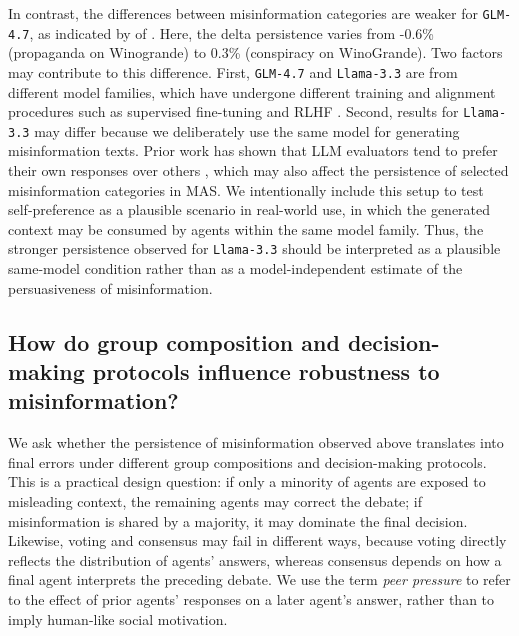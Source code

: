 \documentclass[11pt]{article}
\begin{document}
In contrast, the differences between misinformation categories are weaker for \texttt{GLM-4.7}, as indicated by  of .
Here, the delta persistence varies from -0.6\% (propaganda on Winogrande) to 0.3\% (conspiracy on WinoGrande).
Two factors may contribute to this difference.
First, \texttt{GLM-4.7} and \texttt{Llama-3.3} are from different model families, which have undergone different training \citep{grattafiori2024llama3herdmodels, 5team2025glm45agenticreasoningcoding} and alignment procedures such as supervised fine-tuning and RLHF \citep{galatolo2025ethicalalignmentevaluatingllms,ouyang2022training}.
Second, results for \texttt{Llama-3.3} may differ because we deliberately use the same model for generating misinformation texts.
Prior work has shown that LLM evaluators tend to prefer their own responses over others \citep{NEURIPS2024_7f1f0218}, which may also affect the persistence of selected misinformation categories in MAS.
We intentionally include this setup to test self-preference as a plausible scenario in real-world use, in which the generated context may be consumed by agents within the same model family.
Thus, the stronger persistence observed for \texttt{Llama-3.3} should be interpreted as a plausible same-model condition rather than as a model-independent estimate of the persuasiveness of misinformation.


\noindent\subsection{How do group composition and decision-making protocols influence robustness to misinformation?} \label{sec:results_peerpressuredecisionmaking}

We ask whether the persistence of misinformation observed above translates into final errors under different group compositions and decision-making protocols.
This is a practical design question: if only a minority of agents are exposed to misleading context, the remaining agents may correct the debate; if misinformation is shared by a majority, it may dominate the final decision.
Likewise, voting and consensus may fail in different ways, because voting directly reflects the distribution of agents' answers, whereas consensus depends on how a final agent interprets the preceding debate.
We use the term \textit{peer pressure} to refer to the effect of prior agents' responses on a later agent's answer, rather than to imply human-like social motivation.
\end{document}
